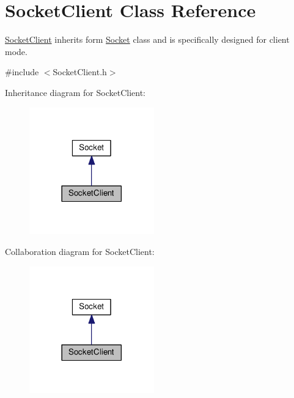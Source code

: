 \hypertarget{classSocketClient}{}\section{Socket\+Client Class Reference}
\label{classSocketClient}


\textquotesingle{}\hyperlink{classSocketClient}{Socket\+Client}\textquotesingle{} inherits form \textquotesingle{}\hyperlink{classSocket}{Socket}\textquotesingle{} class and is specifically designed for client mode.  




{\ttfamily \#include $<$Socket\+Client.\+h$>$}



Inheritance diagram for Socket\+Client\+:
\nopagebreak
\begin{figure}[H]
\begin{center}
\leavevmode
\includegraphics[width=153pt]{classSocketClient__inherit__graph}
\end{center}
\end{figure}


Collaboration diagram for Socket\+Client\+:
\nopagebreak
\begin{figure}[H]
\begin{center}
\leavevmode
\includegraphics[width=153pt]{classSocketClient__coll__graph}
\end{center}
\end{figure}
